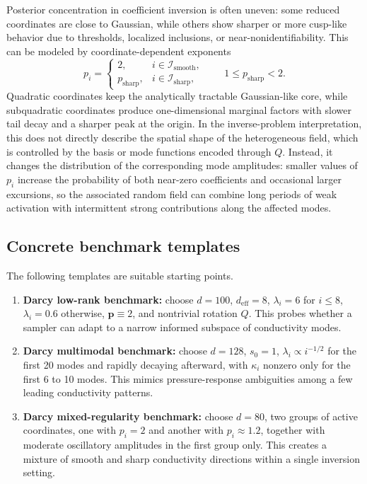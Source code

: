 \documentclass[11pt,a4paper]{article}
\newcommand{\symbfit}[1]{\bm{#1}}
\newcommand{\vc}[1]{{\symbfit{#1}}}
\begin{document}
Posterior concentration in coefficient inversion is often uneven: some reduced coordinates are close to Gaussian, while others show sharper or more cusp-like behavior due to thresholds, localized inclusions, or near-nonidentifiability. This can be modeled by coordinate-dependent exponents
\[
p_i =
\begin{cases}
2, & i \in \mathcal{I}_{\mathrm{smooth}},\\
p_{\mathrm{sharp}}, & i \in \mathcal{I}_{\mathrm{sharp}},
\end{cases}
\qquad 1 \le p_{\mathrm{sharp}} < 2.
\]
Quadratic coordinates keep the analytically tractable Gaussian-like core, while subquadratic coordinates produce one-dimensional marginal factors with slower tail decay and a sharper peak at the origin. In the inverse-problem interpretation, this does not directly describe the spatial shape of the heterogeneous field, which is controlled by the basis or mode functions encoded through $Q$. Instead, it changes the distribution of the corresponding mode amplitudes: smaller values of $p_i$ increase the probability of both near-zero coefficients and occasional larger excursions, so the associated random field can combine long periods of weak activation with intermittent strong contributions along the affected modes.

\subsection{Concrete benchmark templates}

The following templates are suitable starting points.

\begin{enumerate}
    \item \textbf{Darcy low-rank benchmark:} choose $d=100$, $d_{\mathrm{eff}}=8$, $\lambda_i = 6$ for $i \le 8$, $\lambda_i = 0.6$ otherwise, $\vc p \equiv 2$, and nontrivial rotation $Q$. This probes whether a sampler can adapt to a narrow informed subspace of conductivity modes.
    \item \textbf{Darcy multimodal benchmark:} choose $d=128$, $s_0=1$, $\lambda_i \propto i^{-1/2}$ for the first 20 modes and rapidly decaying afterward, with $\kappa_i$ nonzero only for the first 6 to 10 modes. This mimics pressure-response ambiguities among a few leading conductivity patterns.
    \item \textbf{Darcy mixed-regularity benchmark:} choose $d=80$, two groups of active coordinates, one with $p_i=2$ and another with $p_i \approx 1.2$, together with moderate oscillatory amplitudes in the first group only. This creates a mixture of smooth and sharp conductivity directions within a single inversion setting.
\end{enumerate}
\end{document}
